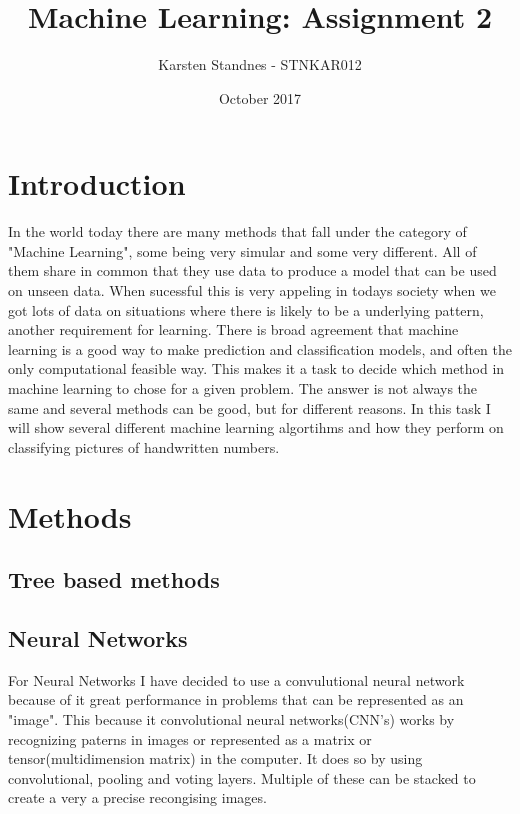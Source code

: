 \documentclass{article}
\title{Machine Learning:  Assignment 2}
\author{Karsten Standnes - STNKAR012}
\date{October 2017}
\begin{document}
\maketitle
\setlength\parindent{0pt}

\section{Introduction}

In the world today there are many methods that fall under the category of "Machine
Learning", some being very simular and some very different. All of them share in common
that they use data to produce a model that can be used on unseen data. When sucessful this
is very appeling in todays society when we got lots of data on situations where there is likely
to be a underlying pattern, another requirement for learning. There is broad agreement
that machine learning is a good way to make prediction and classification models, and often
the only computational feasible way. This makes it a task to decide which method in
machine learning to chose for a given problem. The answer is not always the same and
several methods can be good, but for different reasons. In this task I will show several
different machine learning algortihms and how they perform on classifying pictures
of handwritten numbers.

\section{Methods}

\subsection{Tree based methods}



\subsection{Neural Networks}
For Neural Networks I have decided to use a convulutional neural network because of
it great performance in problems that can be represented as an "image". This because it
convolutional neural networks(CNN's) works by recognizing paterns in images or represented as
a matrix or tensor(multidimension matrix) in the computer. It does so by using convolutional,
pooling and voting layers. Multiple of these can be stacked to create a very a precise recongising
images.
\end{document}
